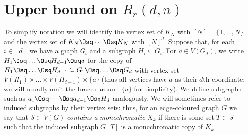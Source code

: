 \section{Upper bound on $R_r(d,n)$}\label{Sec:Rdn}
To simplify notation we will identify the vertex set of $K_N$ with $[N]=\{1,\dots,N\}$ and the vertex set of $K_N\Osq \cdots \Osq K_N$ with $[N]^d$.  Suppose that, for each $i\in[d]$ we have a graph $G_i$ and a subgraph $H_i\subseteq G_i$. For $a\in V(G_d)$,  we write $H_1\Osq\dots\Osq H_{d-1}\Osq a$ for the copy of $H_1\Osq\dots\Osq H_{d-1}\subseteq G_1\Osq\dots\Osq G_{d}$ with vertex set $V(H_1)\times\dots\times V(H_{d-1})\times \{a\}$ (thus all vertices have $a$ as their $d$th coordinate; we will usually omit the braces around $\{a\}$ for simplicity). We define subgraphs such as $a_1\Osq \cdots\Osq a_{d-1}\Osq H_{d}$ analogously.
We will sometimes refer to induced subgraphs by their vertex sets: thus, for an edge-coloured graph $G$ we  say that $S\subset V(G)$ {\em contains a monochromatic $K_k$} if there is some set $T\subset S$ such that the induced subgraph $G[T]$ is a monochromatic copy of $K_k$.
